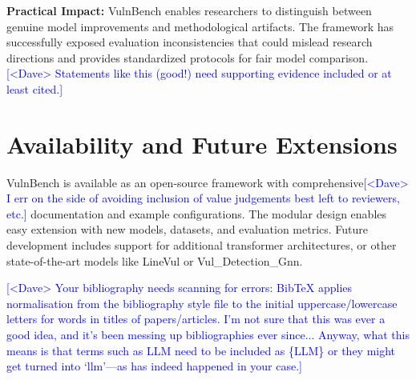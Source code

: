 \documentclass[letterpaper]{article}
\newcommand{\note}[2][red]{\textcolor{#1}{#2}}
\newcommand{\notedme}[1]{\note[blue]{[<Dave> #1]}}
\begin{document}
\textbf{Practical Impact:} VulnBench enables researchers to distinguish between genuine model improvements and methodological artifacts. The framework has successfully exposed evaluation inconsistencies that could mislead research directions and provides standardized protocols for fair model comparison.
\notedme{Statements like this (good!) need supporting evidence included or at least cited.}

\section{Availability and Future Extensions}

VulnBench is available as an open-source framework with comprehensive\notedme{I err on the side of avoiding inclusion of value judgements best left to reviewers, etc.} documentation and example configurations. The modular design enables easy extension with new models, datasets, and evaluation metrics. Future development includes support for additional transformer architectures, or other state-of-the-art models like LineVul or Vul\_Detection\_Gnn.

\notedme{Your bibliography needs scanning for errors: BibTeX applies normalisation from the bibliography style file to the initial uppercase/lowercase letters for words in titles of papers/articles. I'm not sure that this was ever a good idea, and it's been messing up bibliographies ever since... Anyway, what this means is that terms such as LLM need to be included as \{LLM\} or they might get turned into `llm'---as has indeed happened in your case.}



\end{document}
